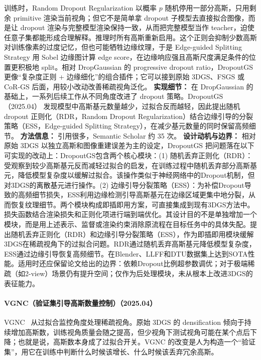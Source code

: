 训练时，Random Dropout Regularization 以概率 $p$ 随机停用一部分高斯，只用剩余 primitive 渲染当前视角；但它不是简单拿 dropout 子模型去直接拟合图像，而是让 dropout 渲染与完整模型渲染保持一致，从而把完整模型当作 teacher，迫使任意子集都能形成合理解释。推理时所有高斯重新启用。这个正则会抑制少数高斯对训练像素的过度记忆，但也可能牺牲边缘纹理，于是 Edge-guided Splitting Strategy 用 Sobel 边缘图计算 edge score，在边缘响应强且高斯尺度满足条件的位置更积极地 split。相对 DropGaussian 的 progressive dropout ratio，DropoutGS 更像“复杂度正则 + 边缘细化”的组合插件；它可以接到原始 3DGS、FSGS 或 CoR-GS 后面，用较小改动改善稀疏视角泛化。
\textbf{实现细节：} 在 DropGaussian 的基础上，一系列后续工作从不同角度改进了 dropout 策略。DropoutGS（2025.04） 发现模型中高斯基元数量越少，过拟合反而越轻，因此提出随机 dropout 正则化（RDR，Random Dropout Regularization）结合边缘引导的分裂策略（ESS，Edge-guided Splitting Strategy），在减少基元数量的同时保留高频细节。
\textbf{方法信息：} 引用很多，Semantic Scholar 约 35 次。
\textbf{设计动机与边界：} 相对原始 3DGS 以独立高斯和图像重建误差为主的设定，DropoutGS 把问题落在以下可实现的改动上：DropoutGS包含两个核心模块：(1) 随机丢弃正则化（RDR）：受观察到较少高斯基元反而减轻过拟合的启发，在训练过程中随机丢弃部分高斯基元，降低模型复杂度以缓解过拟合。该操作类似于神经网络中的Dropout机制，但对3DGS的离散基元进行操作。(2) 边缘引导分裂策略（ESS）：为补偿Dropout导致的高频细节损失，ESS利用边缘检测引导高斯基元在边缘区域更集中地分裂，从而恢复纹理细节。两个模块构成即插即用方案，可直接集成到现有3DGS方法中。损失函数结合渲染损失和正则化项进行端到端优化。其设计目的不是单独增加一个模块，而是用上述表示、监督或渲染约束消除原流程在目标任务中的具体失配。提出随机丢弃正则化（RDR）和边缘引导分裂策略（ESS），作为即插即用模块缓解3DGS在稀疏视角下的过拟合问题。RDR通过随机丢弃高斯基元降低模型复杂度，ESS通过边缘引导恢复高频细节。在Blender、LLFF和DTU数据集上达到SOTA性能。适用时还应保留论文给出的边界：依赖Dropout比例超参数调优；对于极端稀疏（如2-view）场景仍有提升空间；仅作为后处理模块，未从根本上改进3DGS的表征能力。
\paragraph{VGNC（验证集引导高斯数量控制）（2025.04）}
VGNC~\cite{2504_14548} 从过拟合监控角度处理稀疏视角。原始 3DGS 的 densification 倾向于持续增加高斯数，训练视角质量会随之提高，但少视角下测试视角可能在某个点后下降；也就是说，高斯数本身成了过拟合开关。VGNC 的改变是人为构造一个“验证集”，用它在训练中判断什么时候该增长、什么时候该丢弃冗余高斯。


